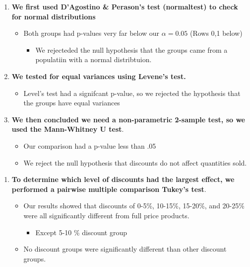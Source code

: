 \documentclass[11pt]{article}
\providecommand{\tightlist}{%
      \setlength{\itemsep}{0pt}\setlength{\parskip}{0pt}}
\begin{document}
    
    \begin{enumerate}
\def\labelenumi{\arabic{enumi}.}
\tightlist
\item
  \textbf{We first used D'Agostino \& Perason's test (normaltest) to
  check for normal distributions}

  \begin{itemize}
  \tightlist
  \item
    Both groups had p-values very far below our \(\alpha=0.05\) (Rows
    0,1 below)

    \begin{itemize}
    \tightlist
    \item
      We rejecteded the null hypothesis that the groups came from a
      populatiin with a normal distribtuion.
    \end{itemize}
  \end{itemize}
\item
  \textbf{We tested for equal variances using Levene's test.}

  \begin{itemize}
  \tightlist
  \item
    Level's test had a signifcant p-value, so we rejected the hypothesis
    that the groups have equal variances
  \end{itemize}
\item
  \textbf{We then concluded we need a non-parametric 2-sample test, so
  we used the Mann-Whitney U test}.

  \begin{itemize}
  \tightlist
  \item
    Our comparison had a p-value less than .05
  \item
    We reject the null hypothesis that discounts do not affect
    quantities sold.
  \end{itemize}
\end{enumerate}

    \begin{enumerate}
\def\labelenumi{\arabic{enumi}.}
\setcounter{enumi}{3}
\tightlist
\item
  \textbf{To determine which level of discounts had the largest effect,
  we performed a pairwise multiple comparison Tukey's test}.

  \begin{itemize}
  \tightlist
  \item
    Our results showed that discounts of 0-5\%, 10-15\%, 15-20\%, and
    20-25\% were all significantly different from full price products.

    \begin{itemize}
    \tightlist
    \item
      Except 5-10 \% discount group
    \end{itemize}
  \item
    No discount groups were significantly different than other discount
    groups.
  \end{itemize}
\end{enumerate}
\end{document}
